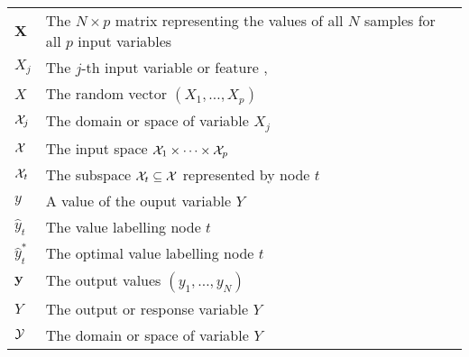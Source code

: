 \begin{tabularx}{\textwidth}{ l X }
$\textbf{X}$ & The $N\times p$ matrix representing the values of all $N$ samples for all $p$ input variables \dotfill  \pageref{ntn:matrix-X}\\
$X_j$ & The $j$-th input variable or feature \dotfill  \pageref{ntn:var-X_j}, \pageref{ntn:var-X_j2}\\
$X$ & The random vector $(X_1,\dots,X_p)$ \dotfill  \pageref{ntn:vector-X}\\
${\cal X}_j$ & The domain or space of variable $X_j$ \dotfill  \pageref{ntn:space-X_j}\\
${\cal X}$ & The input space ${\cal X}_1 \times \dots \times {\cal X}_p$ \dotfill  \pageref{ntn:space-X}\\
${\cal X}_t$ & The subspace ${\cal X}_t \subseteq {\cal X}$ represented by node $t$ \dotfill  \pageref{ntn:node-space}\\
$y$ & A value of the ouput variable $Y$ \dotfill  \pageref{ntn:value-y}\\
$\widehat{y}_t$ & The value labelling node $t$ \dotfill  \pageref{ntn:y_t}\\
$\widehat{y}_t^*$ & The optimal value labelling node $t$ \dotfill  \pageref{ntn:y_t-star}\\
$\mathbf{y}$ & The output values $(y_1,\dots,y_N)$ \dotfill  \pageref{ntn:vector-y}\\
$Y$ & The output or response variable $Y$ \dotfill  \pageref{ntn:var-Y}\\
${\cal Y}$ & The domain or space of variable $Y$ \dotfill  \pageref{ntn:space-Y}\\
\end{tabularx}
